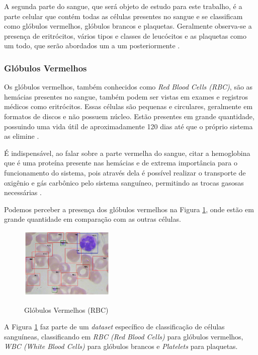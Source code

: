 A segunda parte do sangue, que será objeto de estudo para este trabalho, é a parte celular que contém todas as células presentes no sangue e se classificam como glóbulos vermelhos, glóbulos brancos e plaquetas. Geralmente observa-se a presença de eritrócitos, vários tipos e classes de leucócitos e as plaquetas como um todo, que serão abordados um a um posteriormente \cite{manualHematologia}.

\subsubsection{Glóbulos Vermelhos}
Os glóbulos vermelhos, também conhecidos como \emph{Red Blood Cells (RBC)}, são as hemácias presentes no sangue, também podem ser vistas em exames e registros médicos como eritrócitos. Essas células são pequenas e circulares, geralmente em formatos de discos e não possuem núcleo. Estão presentes em grande quantidade, possuindo uma vida útil de aproximadamente 120 dias até que o próprio sistema as elimine \cite{manualHematologia}.

É indispensável, ao falar sobre a parte vermelha do sangue, citar a hemoglobina que é uma proteína presente nas hemácias e de extrema importância para o funcionamento do sistema, pois através dela é possível realizar o transporte de oxigênio e gás carbônico pelo sistema sanguíneo, permitindo as trocas gasosas necessárias \cite{manualHematologia}.

Podemos perceber a presença dos glóbulos vermelhos na Figura \ref{fig:rbc}, onde estão em grande quantidade em comparação com as outras células. 

\begin{figure}[!htb]
	\centering
	\caption{Glóbulos Vermelhos (RBC)}
	\includegraphics[width=0.40\textwidth]{img/rbc.jpg}
	\label{fig:rbc}
\end{figure}

A Figura \ref{fig:rbc} faz parte de um \emph{dataset} específico de classificação de células sanguíneas, classificando em \emph{RBC (Red Blood Cells)} para glóbulos vermelhos, \emph{WBC (White Blood Cells)} para glóbulos brancos e \emph{Platelets} para plaquetas.
 
